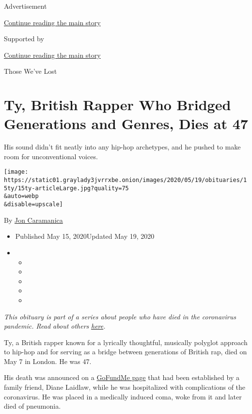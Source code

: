 Advertisement

\protect\hyperlink{after-top}{Continue reading the main story}

Supported by

\protect\hyperlink{after-sponsor}{Continue reading the main story}

Those We've Lost

\hypertarget{ty-british-rapper-who-bridged-generations-and-genres-dies-at-47}{%
\section{Ty, British Rapper Who Bridged Generations and Genres, Dies at
47}\label{ty-british-rapper-who-bridged-generations-and-genres-dies-at-47}}

His sound didn't fit neatly into any hip-hop archetypes, and he pushed
to make room for unconventional voices.

\texttt{[image: https://static01.graylady3jvrrxbe.onion/images/2020/05/19/obituaries/15ty/15ty-articleLarge.jpg?quality=75\\\&auto=webp\\\&disable=upscale]}

By \href{https://www.nytimes3xbfgragh.onion/by/jon-caramanica}{Jon
Caramanica}

\begin{itemize}
\item
  Published May 15, 2020Updated May 19, 2020
\item
  \begin{itemize}
  \item
  \item
  \item
  \item
  \item
  \end{itemize}
\end{itemize}

\emph{This obituary is part of a series about people who have died in
the coronavirus pandemic. Read about others}
\href{https://www.nytimes3xbfgragh.onion/series/people-who-have-died-of-the-coronavirus}{\emph{here}}\emph{.}

Ty, a British rapper known for a lyrically thoughtful, musically
polyglot approach to hip-hop and for serving as a bridge between
generations of British rap, died on May 7 in London. He was 47.

His death was announced on a
\href{https://www.gofundme.com/f/community-support-for-ty}{GoFundMe
page} that had been established by a family friend, Diane Laidlaw, while
he was hospitalized with complications of the coronavirus. He was placed
in a medically induced coma, woke from it and later died of pneumonia.

